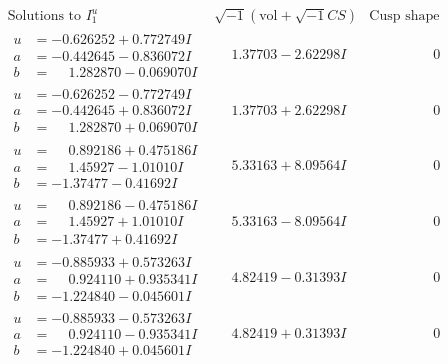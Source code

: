 \documentclass[1p]{elsarticle_modified}
\theoremstyle{definition}
\newcommand{\I}{\sqrt{-1}}
\begin{document}
$$\begin{array}{c|c|c}  
\text{Solutions to }I^u_{1}& \I (\text{vol} + \sqrt{-1}CS) & \text{Cusp shape}\\
 \hline 
\begin{aligned}
u &= -0.626252 + 0.772749 I \\
a &= -0.442645 - 0.836072 I \\
b &= \phantom{-}1.282870 - 0.069070 I\end{aligned}
 & \phantom{-}1.37703 - 2.62298 I & \phantom{-0.000000 } 0 \\ \hline\begin{aligned}
u &= -0.626252 - 0.772749 I \\
a &= -0.442645 + 0.836072 I \\
b &= \phantom{-}1.282870 + 0.069070 I\end{aligned}
 & \phantom{-}1.37703 + 2.62298 I & \phantom{-0.000000 } 0 \\ \hline\begin{aligned}
u &= \phantom{-}0.892186 + 0.475186 I \\
a &= \phantom{-}1.45927 - 1.01010 I \\
b &= -1.37477 - 0.41692 I\end{aligned}
 & \phantom{-}5.33163 + 8.09564 I & \phantom{-0.000000 } 0 \\ \hline\begin{aligned}
u &= \phantom{-}0.892186 - 0.475186 I \\
a &= \phantom{-}1.45927 + 1.01010 I \\
b &= -1.37477 + 0.41692 I\end{aligned}
 & \phantom{-}5.33163 - 8.09564 I & \phantom{-0.000000 } 0 \\ \hline\begin{aligned}
u &= -0.885933 + 0.573263 I \\
a &= \phantom{-}0.924110 + 0.935341 I \\
b &= -1.224840 - 0.045601 I\end{aligned}
 & \phantom{-}4.82419 - 0.31393 I & \phantom{-0.000000 } 0 \\ \hline\begin{aligned}
u &= -0.885933 - 0.573263 I \\
a &= \phantom{-}0.924110 - 0.935341 I \\
b &= -1.224840 + 0.045601 I\end{aligned}
 & \phantom{-}4.82419 + 0.31393 I & \phantom{-0.000000 } 0 \\ \hline\begin{aligned}

\end{aligned}
\end{array}$$
\end{document}
